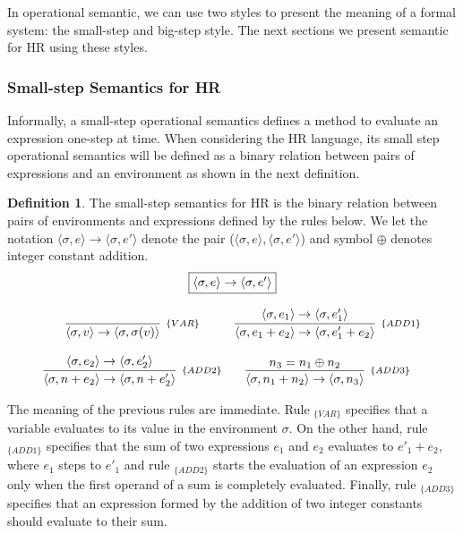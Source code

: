 \documentclass[oneside,12pt]{scrbook}
\theoremstyle{definition}
\theoremstyle{plain}
\theoremstyle{definition}
\newtheorem{Definition}{Definition}
\begin{document}
In operational semantic, we can use two styles to present the meaning of a formal system: the small-step and
big-step style. The next sections we present semantic for HR using these styles.

\subsubsection{Small-step Semantics for HR}\label{subsubsection:small-step}

Informally, a small-step operational semantics defines a method to evaluate an expression one-step at time. When considering the HR language, its small step operational semantics will be defined as
a binary relation between pairs of expressions and an environment as shown in the next definition.

\begin{Definition}
	The small-step semantics for HR is the binary relation between pairs of environments and
	expressions defined by the rules below. We let the notation
	$\langle \sigma, e \rangle \to \langle \sigma, e' \rangle$ denote the pair
	($\langle \sigma, e \rangle , \langle \sigma, e' \rangle$) and symbol $\oplus$ denotes
	integer constant addition.
	\[
	\begin{array}{c}
	\fbox{$\langle \sigma, e \rangle \to \langle \sigma, e' \rangle$} \\  \\
	\begin{array}{cc}
	\infer[_{\{VAR\}}]
	{\langle \sigma, v \rangle \to \langle \sigma, \sigma(v)\rangle}{} &
	\infer[_{\{ADD1\}}]
	{\langle \sigma, e_1 + e_2\rangle \to \langle \sigma, e'_1 + e_2 \rangle}
	{\langle \sigma, e_1\rangle \to \langle \sigma, e'_1\rangle} \\ \\
	\infer[_{\{ADD2\}}]
	{\langle \sigma, n + e_2 \rangle \to \langle \sigma , n + e'_2\rangle}
	{\langle \sigma, e_2 \rangle \to \langle \sigma, e'_2 \rangle} &
	\infer[_{\{ADD3\}}]
	{\langle \sigma, n_1 + n_2 \rangle \to \langle \sigma, n_3 \rangle}
	{n_3 = n_1 \oplus n_2}
	\end{array}
	\end{array}
	\]
\end{Definition}

The meaning of the previous rules are immediate. Rule $_{\{VAR\}}$ specifies that a variable evaluates
to its value in the environment $\sigma$. On the other hand, rule $_{\{ADD1\}}$ specifies that the sum
of two expressions $e_1$ and $e_2$ evaluates to $e'_1 + e_2$, where $e_1$ steps to $e'_1$ and rule
$_{\{ADD2\}}$ starts the evaluation of an expression $e_2$ only when the first operand of a sum is
completely evaluated. Finally, rule $_{\{ADD3\}}$ specifies that an expression formed by the addition of two
integer constants should evaluate to their sum. 
\end{document}
